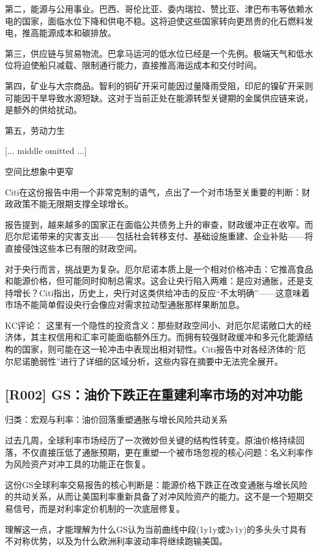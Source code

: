 \documentclass[11pt]{ctexart}
\begin{document}
第二，能源与公用事业。巴西、哥伦比亚、委内瑞拉、赞比亚、津巴布韦等依赖水电的国家，面临水位下降和供电不稳。这将迫使这些国家转向更昂贵的化石燃料发电，推高能源成本和碳排放。

第三，供应链与贸易物流。巴拿马运河的低水位已经是一个先例。极端天气和低水位将迫使船只减载、限制通行能力，直接推高海运成本和交付时间。

第四，矿业与大宗商品。智利的铜矿开采可能因过量降雨受阻，印尼的镍矿开采则可能因干旱导致水源短缺。这对于当前正处在能源转型关键期的金属供应链来说，是额外的供给扰动。

第五，劳动力生

[... middle omitted ...]

空间比想象中更窄

Citi在这份报告中用一个非常克制的语气，点出了一个对市场至关重要的判断：财政政策不能无限期支撑全球增长。

报告提到，越来越多的国家正在面临公共债务上升的审查，财政缓冲正在收窄。而厄尔尼诺带来的灾害支出——包括社会转移支付、基础设施重建、企业补贴——将直接侵蚀这些本已有限的财政空间。

对于央行而言，挑战更为复杂。厄尔尼诺本质上是一个相对价格冲击：它推高食品和能源价格，但可能同时抑制总需求。这会让央行陷入两难：是应对通胀，还是支持增长？Citi指出，历史上，央行对这类供给冲击的反应“不太明确”——这意味着市场不能简单假设央行会像应对需求拉动型通胀那样果断加息。

KC评论： 这里有一个隐性的投资含义：那些财政空间小、对厄尔尼诺敞口大的经济体，其主权信用和汇率可能面临额外压力。而拥有较强财政缓冲和多元化能源结构的国家，则可能在这一轮冲击中表现出相对韧性。Citi报告中对各经济体的“厄尔尼诺脆弱性”进行了详细的区域分析，这些内容在摘要中无法完全展开。

\subsection{[R002] GS：油价下跌正在重建利率市场的对冲功能}
{\small\color{refgray}归类：宏观与利率：油价回落重塑通胀与增长风险共动关系}

过去几周，全球利率市场经历了一次微妙但关键的结构性转变。原油价格持续回落，不仅直接压低了通胀预期，更在重塑一个被市场忽视的核心问题：名义利率作为风险资产对冲工具的功能正在恢复。

这份GS全球利率交易报告的核心判断是：能源价格下跌正在改变通胀与增长风险的共动关系，从而让美国利率重新具备了对冲风险资产的能力。这不是一个短期交易信号，而是对利率定价机制的一次底层修复。

理解这一点，才能理解为什么GS认为当前曲线中段(1y1y或2y1y)的多头头寸具有不对称优势，以及为什么欧洲利率波动率将继续跑输美国。
\end{document}

